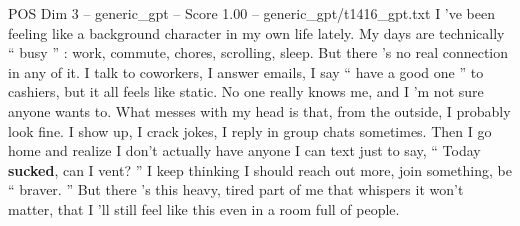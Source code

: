 \begin{textsample}{POS Dim 3 – generic\_gpt – Score 1.00 – generic\_gpt/t1416\_gpt.txt}  \label{ex:f3_pos_034}
I ’ve been feeling like a background character in my own life lately.
My days are technically “ busy ” : work, commute, chores, scrolling, sleep.
But there ’s no real connection in any of it.
I talk to coworkers, I answer emails, I say “ have a good one ” to cashiers, but it all feels like static.
No one really knows me, and I ’m not sure anyone wants to.
What messes with my head is that, from the outside, I probably look fine.
I show up, I crack jokes, I reply in group chats sometimes.
Then I go home and realize I don't actually have anyone I can text just to say, “ Today \textbf{sucked}, can I vent? ” I keep thinking I should reach out more, join something, be “ braver. ” But there ’s this heavy, tired part of me that whispers it won't matter, that I ’ll still feel like this even in a room full of people.

\end{textsample}
